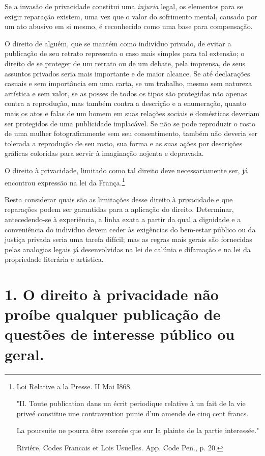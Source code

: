 Se a invasão de privacidade constitui uma \emph{injuria} legal, os
elementos para se exigir reparação existem, uma vez que o valor do
sofrimento mental, causado por um ato abusivo em si mesmo, é reconhecido
como uma base para compensação.

O direito de alguém, que se mantém como indivíduo privado, de evitar a
publicação de seu retrato representa o caso mais simples para tal
extensão; o direito de se proteger de um retrato ou de um debate, pela
imprensa, de seus assuntos privados seria mais importante e de maior
alcance. Se até declarações casuais e sem importância em uma carta, se
um trabalho, mesmo sem natureza artística e sem valor, se as posses de
todos os tipos são protegidas não apenas contra a reprodução, mas também
contra a descrição e a enumeração, quanto mais os atos e falas de um
homem em suas relações sociais e domésticas deveriam ser protegidos de
uma publicidade implacável. Se não se pode reproduzir o rosto de uma
mulher fotograficamente sem seu consentimento, também não deveria ser
tolerada a reprodução de seu rosto, sua forma e as suas ações por
descrições gráficas coloridas para servir à imaginação nojenta e
depravada.

O direito à privacidade, limitado como tal direito deve necessariamente
ser, já encontrou expressão na lei da França.\footnote{Loi Relative a la
  Presse. II Mai I868.

  "II. Toute publication dans un écrit periodique relative à un fait de
  la vie priveé constitue une contravention punie d'un amende de cinq
  cent francs.

  La poursuite ne pourra être exercée que sur la plainte de la partie
  interessée."

  Riviére, Codes Francais et Lois Usuelles. App. Code Pen., p. 20.}

Resta considerar quais são as limitações desse direito à privacidade e
que reparações podem ser garantidas para a aplicação do direito.
Determinar, antecedendo-se à experiência, a linha exata a partir da qual
a dignidade e a conveniência do indivíduo devem ceder às exigências do
bem-estar público ou da justiça privada seria uma tarefa difícil; mas as
regras mais gerais são fornecidas pelas analogias legais já
desenvolvidas na lei de calúnia e difamação e na lei da propriedade
literária e artística.

\section{1. O direito à privacidade não proíbe qualquer publicação de
  questões de interesse público ou geral.}

